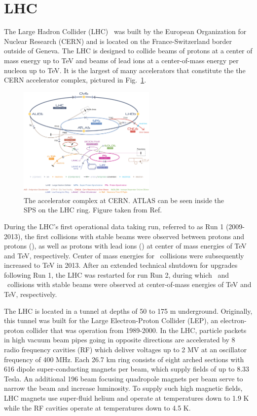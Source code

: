 \section{LHC}
The Large Hadron Collider (LHC)~\cite{Evans:2008zzb} was built by the European Organization for Nuclear Research (CERN) and is located on the France-Switzerland border outside of Geneva. The LHC is designed to collide beams of protons at a center of mass energy up to  TeV and beams of lead ions at a center-of-mass energy per nucleon up to  TeV. It is the largest of many accelerators that constitute the the CERN accelerator complex, pictured in Fig.~\ref{fig:cern}. 

\begin{figure}[ht]
	\centering
	\includegraphics[width=0.60\textwidth]{figures/cern.jpg} %
	\caption{The accelerator complex at CERN. ATLAS can be seen inside the SPS on the LHC ring. Figure taken from Ref.~\cite{cernlhc}}
	\label{fig:cern}%
\end{figure}

During the LHC's first operational data taking run, referred to as Run 1 (2009-2013), the first collisions with stable beams were observed between protons and protons (\pp), as well as protons with lead ions (\pPb) at center of mass energies of  TeV and  TeV, respectively. Center of mass energies for \pPb\ collisions were subsequently increased to  TeV in 2013. After an extended technical shutdown for upgrades following Run 1, the LHC was restarted for run Run 2, during which \pp\ and \pPb\ collisions with stable beams were observed at center-of-mass energies of  TeV and  TeV, respectively. 

The LHC is located in a tunnel at depths of 50 to 175 m underground. Originally, this tunnel was built for the Large Electron-Proton Collider (LEP), an electron-proton collider that was operation from 1989-2000. In the LHC, particle packets in high vacuum beam pipes going in opposite directions are accelerated by 8 radio frequency cavities (RF) which deliver voltages up to 2 MV at an oscillator frequency of 400 MHz. Each 26.7 km ring consists of eight arched sections with 616 dipole super-conducting magnets per beam, which supply fields of up to 8.33 Tesla. An additional 196 beam focusing quadropole magnets per beam serve to narrow the beam and increase luminosity. To supply such high magnetic fields, LHC magnets use super-fluid helium and operate at temperatures down to 1.9 K while the RF cavities operate at temperatures down to 4.5 K.


